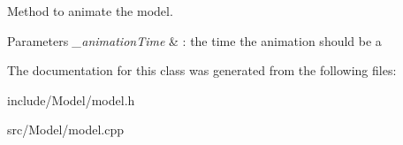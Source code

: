 Method to animate the model. 


\begin{DoxyParams}{Parameters}
{\em \+\_\+animation\+Time} & \+: the time the animation should be a \\
\hline
\end{DoxyParams}


The documentation for this class was generated from the following files\+:\begin{DoxyCompactItemize}
\item 
include/\+Model/model.\+h\item 
src/\+Model/model.\+cpp\end{DoxyCompactItemize}
